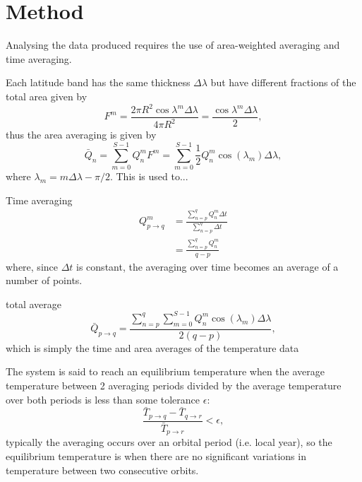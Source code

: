 \documentclass[12pt, onecolumn]{revtex4-2}    %
\begin{document}
\section{Method} \label{sec:Method}

Analysing the data produced requires the use of area-weighted averaging and time averaging.

Each latitude band has the same thickness $\Delta\lambda$ but have different fractions of the total area given by
\begin{equation}
  F^m = \frac{2\pi R^2 \cos\lambda^m \Delta\lambda}{4 \pi R^2} = \frac{\cos\lambda^m \Delta\lambda}{2},
\end{equation}
thus the area averaging is given by
\begin{equation}
  \bar{Q}_n = \sum_{m=0}^{S-1} Q^m_n F^m = \sum_{m = 0}^{S-1} \frac{1}{2}Q^m_n \cos(\lambda_m) \Delta\lambda,
  \label{eq:Q_areaaveraged}
\end{equation}
where $\lambda_m = m \Delta\lambda - \pi / 2$.
This is used to...

Time averaging
\begin{equation}
  \begin{split}
    Q^m_{p \to q} & = \frac{\sum_{n=p}^{q} Q^m_n \Delta t} {\sum_{n=p}^{q} \Delta t} \\
                  & = \frac{\sum_{n=p}^{q} Q^m_n}{q-p}
  \end{split}
  \label{eq:Q_timeaverage}
\end{equation}
where, since $\Delta t$ is constant, the averaging over time becomes an average of a number of points.

total average
\begin{equation}
  \bar{Q}_{p \to q} = \frac{\sum_{n=p}^{q} \sum_{m = 0}^{S-1} Q^m_n \cos(\lambda_m) \Delta\lambda}{2(q-p)},
  \label{eq:Q_totalaverage}
\end{equation}
which is simply the time and area averages of the temperature data

The system is said to reach an equilibrium temperature when the average temperature between 2 averaging periods divided by the average temperature over both periods is less than some tolerance $\epsilon$:
\begin{equation}
  \frac{\bar{T}_{p \to q} - \bar{T}_{q \to r}}{\bar{T}_{p \to r}} < \epsilon,
  \label{eq:T_equilb}
\end{equation}
typically the averaging occurs over an orbital period (i.e. local year), so the equilibrium temperature is when there are no significant variations in temperature between two consecutive orbits.
\end{document}
